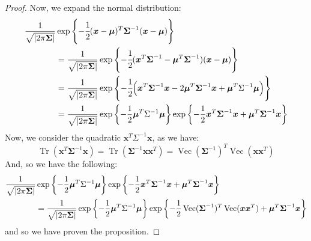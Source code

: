 \begin{proof}
    Now, we expand the normal distribution:
    \begin{equation*}
    \begin{aligned}
        \frac{1}{\sqrt{\left| 2\pi \boldsymbol \Sigma \right|}}&\exp\left\{ -\cfrac{1}{2}(\boldsymbol x-\boldsymbol \mu)^T\boldsymbol \Sigma^{-1}(\boldsymbol x-\boldsymbol \mu) \right\} \\
        &= \frac{1}{\sqrt{\left| 2\pi \boldsymbol \Sigma \right|}}\exp\left\{ -\cfrac{1}{2}(\boldsymbol x^T\boldsymbol \Sigma^{-1}-\boldsymbol \mu^T\boldsymbol \Sigma^{-1})(\boldsymbol x-\boldsymbol \mu) \right\} \\
        &= \frac{1}{\sqrt{\left| 2\pi \boldsymbol \Sigma \right|}}\exp\left\{ -\cfrac{1}{2}\Big(\boldsymbol x^T\boldsymbol \Sigma^{-1}\boldsymbol x-2\boldsymbol \mu^T\boldsymbol \Sigma^{-1}\boldsymbol x + \boldsymbol \mu^T\Sigma^{-1}\boldsymbol \mu \Big)  \right\} \\
        &= \frac{1}{\sqrt{\left| 2\pi \boldsymbol \Sigma \right|}}\exp\left\{ -\frac{1}{2}\boldsymbol \mu^T\Sigma^{-1}\boldsymbol \mu \right\}\exp\left\{ -\frac{1}{2}\boldsymbol x^T\boldsymbol \Sigma^{-1}\boldsymbol x+\boldsymbol \mu^T\boldsymbol \Sigma^{-1}\boldsymbol x  \right\} \\
    \end{aligned}
    \end{equation*}
    Now, we consider the quadratic $\boldsymbol x^T\Sigma^{-1}\boldsymbol x$, as we have:
    \begin{equation*}
        \operatorname{Tr}(\boldsymbol x^T\boldsymbol \Sigma^{-1}\boldsymbol x) = \operatorname{Tr}(\boldsymbol \Sigma^{-1}\boldsymbol x\boldsymbol x^T) = \operatorname{Vec}(\boldsymbol \Sigma^{-1})^T\operatorname{Vec}(\boldsymbol x\boldsymbol x^T)
    \end{equation*}
    And, so we have the following:
    \begin{equation*}
    \begin{aligned}
        \frac{1}{\sqrt{\left| 2\pi \boldsymbol \Sigma \right|}}&\exp\left\{ -\frac{1}{2}\boldsymbol \mu^T\Sigma^{-1}\boldsymbol \mu \right\}\exp\left\{ -\frac{1}{2}\boldsymbol x^T\boldsymbol \Sigma^{-1}\boldsymbol x+\boldsymbol \mu^T\boldsymbol \Sigma^{-1}\boldsymbol x  \right\} \\
        &= \frac{1}{\sqrt{\left| 2\pi \boldsymbol \Sigma \right|}}\exp\left\{ -\frac{1}{2}\boldsymbol \mu^T\Sigma^{-1}\boldsymbol \mu \right\}\exp\left\{ -\frac{1}{2}\operatorname{Vec}(\boldsymbol \Sigma^{-1})^T\operatorname{Vec}(\boldsymbol x\boldsymbol x^T) + \boldsymbol \mu^T\boldsymbol \Sigma^{-1}\boldsymbol x \right\} \\
    \end{aligned}
    \end{equation*}
    and so we have proven the proposition. 
\end{proof}

